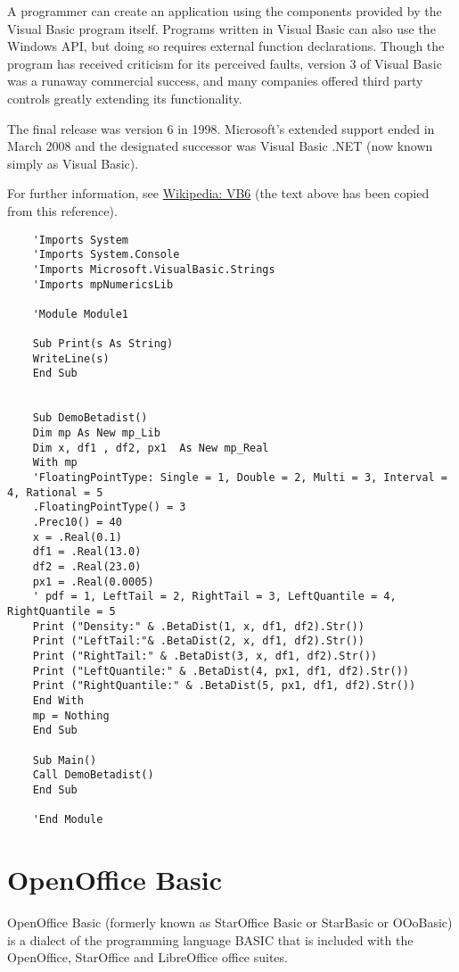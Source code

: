 	\vpara
	A programmer can create an application using the components provided by the Visual Basic program itself. Programs written in Visual Basic can also use the Windows API, but doing so requires external function declarations. Though the program has received criticism for its perceived faults, version 3 of Visual Basic was a runaway commercial success, and many companies offered third party controls greatly extending its functionality.
	
	\vpara
	The final release was version 6 in 1998. Microsoft's extended support ended in March 2008 and the designated successor was Visual Basic .NET (now known simply as Visual Basic).
	
	For further information, see \href{http://en.wikipedia.org/wiki/Visual_Basic}{Wikipedia: VB6} (the text above has been copied from this reference).
	
	\begin{lstlisting}
	'Imports System
	'Imports System.Console
	'Imports Microsoft.VisualBasic.Strings
	'Imports mpNumericsLib
	
	'Module Module1
	
	Sub Print(s As String)
	WriteLine(s)
	End Sub
	
	
	Sub DemoBetadist()
	Dim mp As New mp_Lib
	Dim x, df1 , df2, px1  As New mp_Real
	With mp
	'FloatingPointType: Single = 1, Double = 2, Multi = 3, Interval = 4, Rational = 5
	.FloatingPointType() = 3
	.Prec10() = 40
	x = .Real(0.1)
	df1 = .Real(13.0)
	df2 = .Real(23.0)
	px1 = .Real(0.0005)	
	' pdf = 1, LeftTail = 2, RightTail = 3, LeftQuantile = 4, RightQuantile = 5
	Print ("Density:" & .BetaDist(1, x, df1, df2).Str())
	Print ("LeftTail:"& .BetaDist(2, x, df1, df2).Str())
	Print ("RightTail:" & .BetaDist(3, x, df1, df2).Str())
	Print ("LeftQuantile:" & .BetaDist(4, px1, df1, df2).Str())
	Print ("RightQuantile:" & .BetaDist(5, px1, df1, df2).Str())
	End With
	mp = Nothing
	End Sub
	
	Sub Main()
	Call DemoBetadist()
	End Sub
	
	'End Module
	\end{lstlisting}
	
	
	
	
	\newpage
	\section{OpenOffice Basic}
	
	OpenOffice Basic (formerly known as StarOffice Basic or StarBasic or OOoBasic) is a dialect of the programming language BASIC that is included with the OpenOffice, StarOffice and LibreOffice office suites.
	
